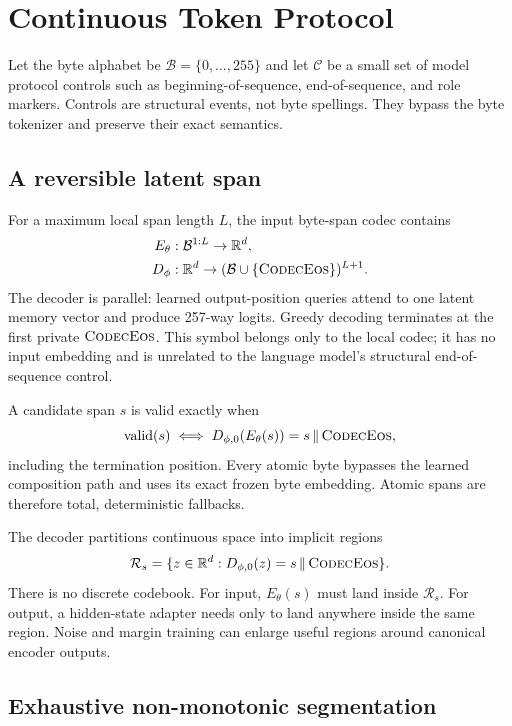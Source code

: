 \documentclass[10pt,twocolumn]{article}
\newcommand{\bytes}{\mathcal{B}}
\newcommand{\controls}{\mathcal{C}}
\newcommand{\reals}{\mathbb{R}}
\newcommand{\codeceos}{\textsc{CodecEos}}
\begin{document}
\section{Continuous Token Protocol}

Let the byte alphabet be $\bytes=\{0,\ldots,255\}$ and let $\controls$ be a small set of model
protocol controls such as beginning-of-sequence, end-of-sequence, and role markers. Controls are
structural events, not byte spellings. They bypass the byte tokenizer and preserve their exact
semantics.

\subsection{A reversible latent span}

For a maximum local span length $L$, the input byte-span codec contains
\begin{align}
E_\theta &: \bytes^{1:L} \rightarrow \reals^d, \\
D_\phi &: \reals^d \rightarrow (\bytes \cup \{\codeceos\})^{L+1}.
\end{align}
The decoder is parallel: learned output-position queries attend to one latent memory vector and
produce 257-way logits. Greedy decoding terminates at the first private $\codeceos$. This symbol
belongs only to the local codec; it has no input embedding and is unrelated to the language
model's structural end-of-sequence control.

A candidate span $s$ is valid exactly when
\begin{equation}
\operatorname{valid}(s) \iff D_{\phi,0}(E_\theta(s)) = s\,\Vert\,\codeceos,
\label{eq:valid}
\end{equation}
including the termination position. Every atomic byte bypasses the learned composition path and
uses its exact frozen byte embedding. Atomic spans are therefore total, deterministic fallbacks.

The decoder partitions continuous space into implicit regions
\begin{equation}
\mathcal{R}_s = \{z \in \reals^d : D_{\phi,0}(z)=s\,\Vert\,\codeceos\}.
\end{equation}
There is no discrete codebook. For input, $E_\theta(s)$ must land inside $\mathcal{R}_s$. For
output, a hidden-state adapter needs only to land anywhere inside the same region. Noise and margin
training can enlarge useful regions around canonical encoder outputs.

\subsection{Exhaustive non-monotonic segmentation}
\end{document}
